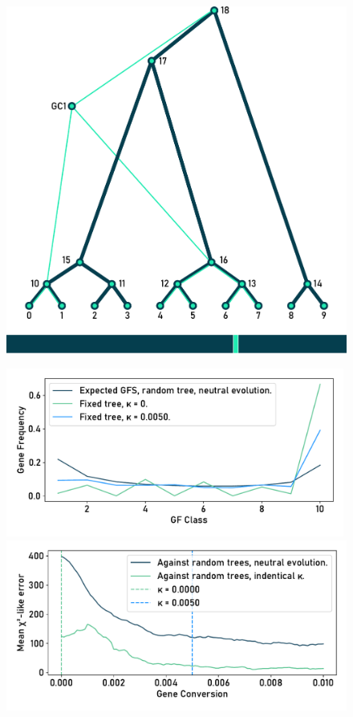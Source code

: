 \begin{figure}[h]
    \centering
    \begin{minipage}{0.49\textwidth}
        \includegraphics[width=\textwidth]{figures/effect_on_gfs/tree_with_gc.pdf}
    \end{minipage}
    \begin{minipage}{0.49\textwidth}
        \hfill\includegraphics[width=0.99\textwidth]{figures/effect_on_gfs/gfs_gc.pdf}\\
        \includegraphics[width=\textwidth]{figures/effect_on_gfs/gfs_gc_factor.pdf}

\end{minipage}
\end{figure}
